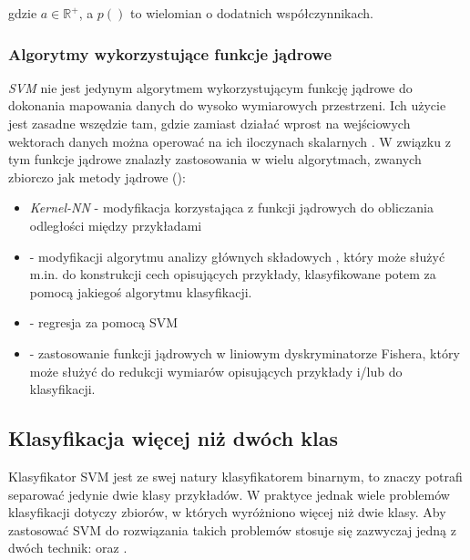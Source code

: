 gdzie $ a \in \mathbb{R}^{+} $, a $ p() $ to wielomian o dodatnich współczynnikach.


\subsubsection{Algorytmy wykorzystujące funkcje jądrowe}
\emph{SVM} nie jest jedynym algorytmem wykorzystującym funkcję jądrowe do dokonania mapowania danych do wysoko wymiarowych przestrzeni. Ich użycie jest zasadne wszędzie tam, gdzie zamiast działać wprost na wejściowych wektorach danych można operować na ich iloczynach skalarnych \cite{scholkopf_learning_2002}. W związku z tym funkcje jądrowe znalazły zastosowania w wielu algorytmach, zwanych zbiorczo jak metody jądrowe ():
\begin{itemize}
	\item \emph{Kernel-NN} \cite{Yu:2002:KNA:607789.607852} - modyfikacja  korzystająca z funkcji jądrowych do obliczania odległości między przykładami
	\item {} \cite{scholkopf_learning_2002} - modyfikacji algorytmu analizy głównych składowych , który może służyć m.in. do konstrukcji cech opisujących przykłady, klasyfikowane potem za pomocą jakiegoś algorytmu klasyfikacji.
	\item {} - regresja za pomocą SVM
	\item {} \cite{scholkopf_learning_2002} - zastosowanie funkcji jądrowych w liniowym dyskryminatorze Fishera, który może służyć do redukcji wymiarów opisujących przykłady i/lub do klasyfikacji.
\end{itemize}

\subsection{Klasyfikacja więcej niż dwóch klas}
Klasyfikator SVM jest ze swej natury klasyfikatorem binarnym, to znaczy potrafi separować jedynie dwie klasy przykładów. W praktyce jednak wiele problemów klasyfikacji dotyczy zbiorów, w których wyróżniono więcej niż dwie klasy. Aby zastosować SVM do rozwiązania takich problemów stosuje się zazwyczaj jedną z dwóch technik:  oraz . 

